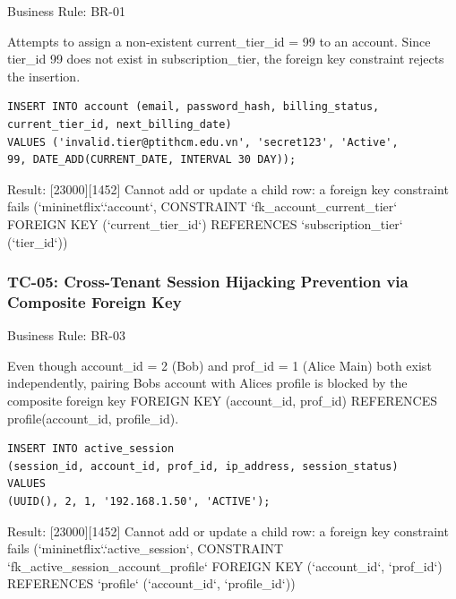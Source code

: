 Business Rule: BR-01

Attempts to assign a non-existent current\_\allowbreak{}tier\_\allowbreak{}id = 99 to an account. Since tier\_\allowbreak{}id 99 does not exist in subscription\_\allowbreak{}tier, the foreign key constraint rejects the insertion.

\begin{lstlisting}[style=reportsql,title={Verification SQL}]
INSERT INTO account (email, password_hash, billing_status,
current_tier_id, next_billing_date)
VALUES ('invalid.tier@ptithcm.edu.vn', 'secret123', 'Active',
99, DATE_ADD(CURRENT_DATE, INTERVAL 30 DAY));
\end{lstlisting}



\textbullet{} Result: {[}23000{]}{[}1452{]} Cannot add or update a child row: a foreign key constraint fails (`mininetflix`.`account`, CONSTRAINT `fk\_\allowbreak{}account\_\allowbreak{}current\_\allowbreak{}tier` FOREIGN KEY (`current\_\allowbreak{}tier\_\allowbreak{}id`) REFERENCES `subscription\_\allowbreak{}tier` (`tier\_\allowbreak{}id`))

\subsubsection{\texorpdfstring{\textbullet{} \textbf{TC-05: Cross-Tenant Session Hijacking Prevention via Composite Foreign Key}}{\textbullet{} TC-05: Cross-Tenant Session Hijacking Prevention via Composite Foreign Key}}\label{tc-05-cross-tenant-session-hijacking-prevention-via-composite-foreign-key}

Business Rule: BR-03

Even though account\_\allowbreak{}id = 2 (Bob) and prof\_\allowbreak{}id = 1 (Alice Main) both exist independently, pairing Bob\textquotesingle s account with Alice\textquotesingle s profile is blocked by the composite foreign key FOREIGN KEY (account\_\allowbreak{}id, prof\_\allowbreak{}id) REFERENCES profile(account\_\allowbreak{}id, profile\_\allowbreak{}id).

\begin{lstlisting}[style=reportsql,title={Verification SQL}]
INSERT INTO active_session
(session_id, account_id, prof_id, ip_address, session_status)
VALUES
(UUID(), 2, 1, '192.168.1.50', 'ACTIVE');
\end{lstlisting}



 \textbullet{} Result: {[}23000{]}{[}1452{]} Cannot add or update a child row: a foreign key constraint fails (`mininetflix`.`active\_\allowbreak{}session`, CONSTRAINT `fk\_\allowbreak{}active\_\allowbreak{}session\_\allowbreak{}account\_\allowbreak{}profile` FOREIGN KEY (`account\_\allowbreak{}id`, `prof\_\allowbreak{}id`) REFERENCES `profile` (`account\_\allowbreak{}id`, `profile\_\allowbreak{}id`))

